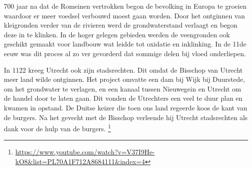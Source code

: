 700 jaar na dat de Romeinen vertrokken begon de bevolking in Europa te groeien waardoor er meer voedsel verbouwd moest gaan worden.
Door het ontginnen van kleigronden verder van de rivieren werd de grondwaterstand verlaagt en begon deze in te klinken.
In de hoger gelegen gebieden werden de veengronden ook geschikt gemaakt voor landbouw wat leidde tot oxidatie en inklinking.
In de 11de eeuw was dit proces al zo ver gevorderd dat sommige delen bij vloed onderliepen.

In 1122 kreeg Utrecht ook zijn stadsrechten.
Dit omdat de Bisschop van Utrecht meer land wilde ontginnen.
Het project omvatte een dam bij Wijk bij Duurstede, om het grondwater te verlagen,
en een kanaal tussen Nieuwegein en Utrecht om de handel door te laten gaan.
Dit vonden de Utrechters een veel te duur plan en kwamen in opstand.
De Duitse keizer die toen ons land regeerde koos de kant van de burgers.
Na het gevecht met de Bisschop verleende hij Utrecht stadsrechten als dank voor de hulp van de burgers.
\footnote{\url{https://www.youtube.com/watch?v=V37I9He-kO8&list=PL70A1F712A8684111&index=4}}


